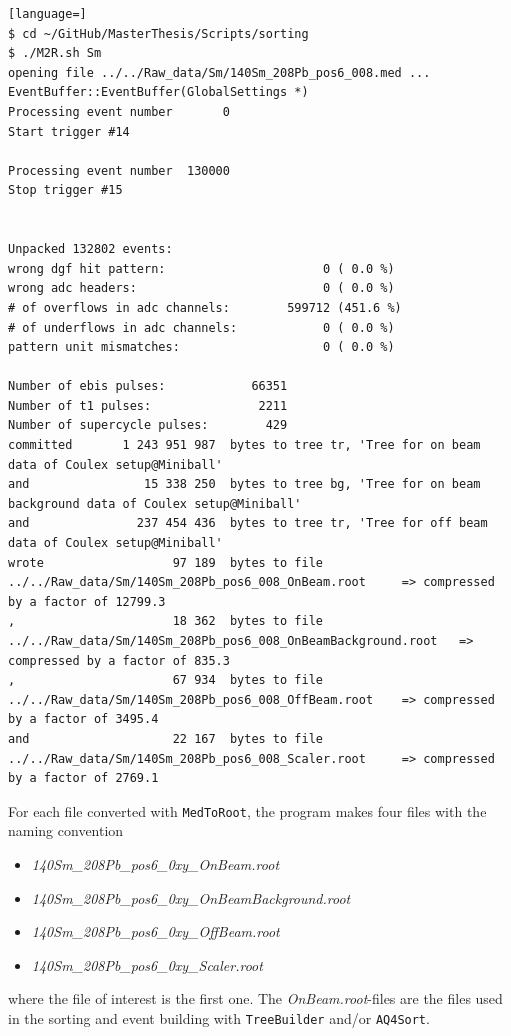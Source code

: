 \documentclass[twoside,english]{uiofysmaster/uiofysmaster}
\begin{document}
\begin{lstlisting}[language=]
$ cd ~/GitHub/MasterThesis/Scripts/sorting
$ ./M2R.sh Sm
opening file ../../Raw_data/Sm/140Sm_208Pb_pos6_008.med ...
EventBuffer::EventBuffer(GlobalSettings *)
Processing event number       0
Start trigger #14

Processing event number  130000
Stop trigger #15


Unpacked 132802 events:
wrong dgf hit pattern:                      0 ( 0.0 %)
wrong adc headers:                          0 ( 0.0 %)
# of overflows in adc channels:        599712 (451.6 %)
# of underflows in adc channels:            0 ( 0.0 %)
pattern unit mismatches:                    0 ( 0.0 %)

Number of ebis pulses:            66351
Number of t1 pulses:               2211
Number of supercycle pulses:        429
committed       1 243 951 987  bytes to tree tr, 'Tree for on beam data of Coulex setup@Miniball'
and                15 338 250  bytes to tree bg, 'Tree for on beam background data of Coulex setup@Miniball'
and               237 454 436  bytes to tree tr, 'Tree for off beam data of Coulex setup@Miniball'
wrote                  97 189  bytes to file ../../Raw_data/Sm/140Sm_208Pb_pos6_008_OnBeam.root 	=> compressed by a factor of 12799.3
,                      18 362  bytes to file ../../Raw_data/Sm/140Sm_208Pb_pos6_008_OnBeamBackground.root 	=> compressed by a factor of 835.3
,                      67 934  bytes to file ../../Raw_data/Sm/140Sm_208Pb_pos6_008_OffBeam.root 	=> compressed by a factor of 3495.4
and                    22 167  bytes to file ../../Raw_data/Sm/140Sm_208Pb_pos6_008_Scaler.root 	=> compressed by a factor of 2769.1
\end{lstlisting}

For each file converted with \texttt{MedToRoot}, the program makes four files with the naming convention
\begin{itemize}
	\item \textit{140Sm\_208Pb\_pos6\_0xy\_OnBeam.root} 
	\item \textit{140Sm\_208Pb\_pos6\_0xy\_OnBeamBackground.root}
	\item \textit{140Sm\_208Pb\_pos6\_0xy\_OffBeam.root}
	\item \textit{140Sm\_208Pb\_pos6\_0xy\_Scaler.root} 
\end{itemize}
where the file of interest is the first one. The \textit{OnBeam.root}-files are the files used in the sorting and event building with \texttt{TreeBuilder} and/or \texttt{AQ4Sort}.
\end{document}
